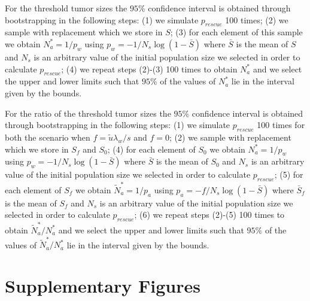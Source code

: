 \documentclass[12pt]{extarticle}
\newcommand{\beginsupplement}{%
      	\setcounter{table}{0}
        \renewcommand{\thetable}{S\arabic{table}}%
        \setcounter{figure}{0}
        \renewcommand{\thefigure}{S\arabic{figure}}%
		\setcounter{equation}{0}
        \renewcommand{\theequation}{A\arabic{equation}}%
}
\begin{document}
\begin{appendices}
For the threshold tumor sizes the $95\%$ confidence interval is obtained through bootstrapping in the following steps: (1) we simulate $p_{rescue}$ 100 times; (2) we sample with replacement which we store in $S$; (3) for each element of this sample we obtain $N_a^*=1/p_w$ using $p_w=-1/N_s\log\left(1-\bar{S}\right)$ where $\bar{S}$ is the mean of $S$ and $N_s$ is an arbitrary value of the initial population size we selected in order to calculate $p_{rescue}$; (4) we repeat steps (2)-(3) 100 times to obtain $N_a^*$ and we select the upper and lower limits such that $95\%$ of the values of $N_a^*$ lie in the interval given by the bounds.

For the ratio of the threshold tumor sizes the $95\%$ confidence interval is obtained through bootstrapping in the following steps: (1) we simulate $p_{rescue}$ 100 times for both the scenario when $f=\tilde{u}\lambda_w/s$ and $f=0$; (2) we sample with replacement which we store in $S_f$ and  $S_0$; (4) for each element of $S_0$ we obtain $N_a^*=1/p_w$ using $p_w=-1/N_s\log\left(1-\bar{S}\right)$ where $\bar{S}$ is the mean of $S_0$ and $N_s$ is an arbitrary value of the initial population size we selected in order to calculate $p_{rescue}$; (5) for each element of $S_f$ we obtain $\tilde{N}_a^*=1/p_a$ using $p_a=-f/N_s\log\left(1-\bar{S}\right)$ where $\bar{S}_f$ is the mean of $S_f$ and $N_s$ is an arbitrary value of the initial population size we selected in order to calculate $p_{rescue}$; (6) we repeat steps (2)-(5) 100 times to obtain $\tilde{N}_a^*/N_a^*$ and we select the upper and lower limits such that $95\%$ of the values of $\tilde{N}_a^*/N_a^*$ lie in the interval given by the bounds.

\newpage
\section*{Supplementary Figures}
\beginsupplement %


\end{appendices}
\end{document}
